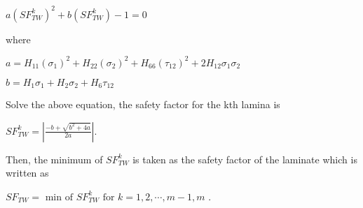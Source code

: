 $a(SF_{TW}^k)^2 + b(SF_{TW}^k) - 1 = 0 $

where 

$a = H_{11}(\sigma_1)^2 + H_{22}(\sigma_2)^2 +H_{66}(\tau_{12})^2 +
2H_{12}\sigma_1 \sigma_2 $

$b = H_1\sigma_1 + H_2 \sigma_2 + H_6 \tau_{12}$

Solve the above equation, the safety factor for the kth lamina is 

$SF_{TW}^k = |\frac{-b+ \sqrt{b^2 + 4a}}{2a}|$.

Then, the minimum of $SF_{TW}^k$ is taken as the safety factor of the
laminate which is written as

$SF_{TW}= \text{ min of } SF_{TW}^k \text{ for } k=1,2,\cdots, m-1,m$ .


